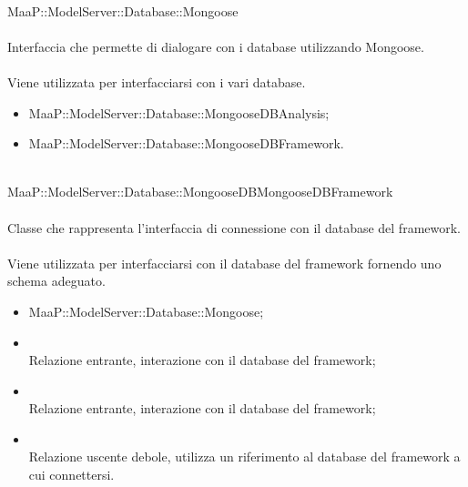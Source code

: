	\\
	MaaP::ModelServer::Database::Mongoose\\
	\\
	Interfaccia che permette di dialogare con i database utilizzando Mongoose.\\
	\\
	Viene utilizzata per interfacciarsi con i vari database.\\
	\begin{itemize}
	\item MaaP::ModelServer::Database::MongooseDBAnalysis;
	\item MaaP::ModelServer::Database::MongooseDBFramework.	
	\end{itemize}
		
	\\
	MaaP::ModelServer::Database::MongooseDBMongooseDBFramework\\
	\\
	Classe che rappresenta l'interfaccia di connessione con il database del framework.\\
	\\
	Viene utilizzata per interfacciarsi con il database del framework fornendo uno schema adeguato.\\
	\begin{itemize}
	\item MaaP::ModelServer::Database::Mongoose;
	\end{itemize}
	\begin{itemize}
	\item{}\\
	Relazione entrante, interazione con il database del framework;
	\item{}\\
	Relazione entrante, interazione con il database del framework;
	\item{}\\
	Relazione uscente debole, utilizza un riferimento al database del framework a cui connettersi.
	\end{itemize}
	
